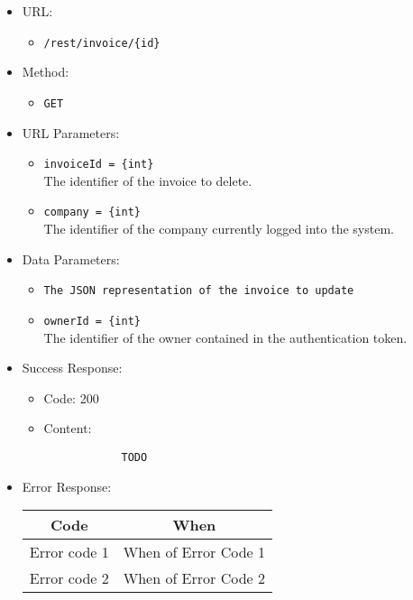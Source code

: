 \begin{itemize}
    
    \item URL: 
    \begin{itemize}
        \item \texttt{/rest/invoice/\{id\}}
    \end{itemize}
    
    \item Method: 
    \begin{itemize}
        \item \texttt{GET}
    \end{itemize}
    
    \item URL Parameters: 
    \begin{itemize}
        \item \texttt{invoiceId = \{int\}} \\
        The identifier of the invoice to delete.
        \item \texttt{company = \{int\}} \\
        The identifier of the company currently logged into the system.
    \end{itemize}
    
    \item Data Parameters: 
    \begin{itemize}
	\item \texttt{The JSON representation of the invoice to update}
        \item \texttt{ownerId = \{int\}} \\
        The identifier of the owner contained in the authentication token.
    \end{itemize}
    
    \item Success Response: 
    \begin{itemize}
        \item Code: 200
        \item Content:
        \begin{lstlisting}
            TODO
        \end{lstlisting}    
    \end{itemize}
    
    \item Error Response:
    \begin{table}[!h]
    \centering 
    \begin{tabular}{|c|c|}
    \hline
    \multicolumn{1}{|c|}{\textbf{Code}} & \multicolumn{1}{c|}{\textbf{When}} \\ \hline
    Error code 1 & When of Error Code 1 \\\hline
    Error code 2 & When of Error Code 2 \\\hline
    \end{tabular} 
    \end{table} 
    
\end{itemize}








